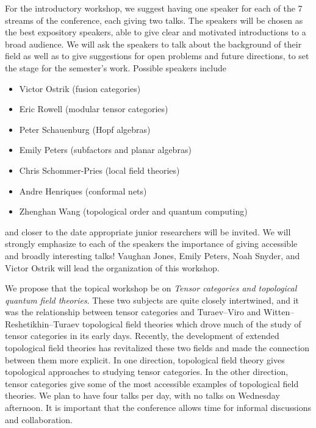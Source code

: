 \documentclass[12pt]{article}
\begin{document}
For the introductory workshop, we suggest having one speaker for each of the 7 streams of the conference, each giving two talks.  The speakers will be chosen as the best expository speakers, able to give clear and motivated introductions to a broad audience. We will ask the speakers to talk about the background of their field as well as to give suggestions for open problems and future directions, to set the stage for the semester's work. Possible speakers include
\begin{itemize}
  \setlength{\itemsep}{1pt}
  \setlength{\parskip}{0pt}
  \setlength{\parsep}{0pt}
\item Victor Ostrik (fusion categories) 
\item Eric Rowell (modular tensor categories)
\item Peter Schauenburg (Hopf algebras)
\item Emily Peters (subfactors and planar algebras) %
\item Chris Schommer-Pries (local field theories) %
\item Andre Henriques (conformal nets) %
\item Zhenghan Wang (topological order and quantum computing) %
\end{itemize}
and closer to the date appropriate junior researchers will be invited. 
We will strongly emphasize to each of the speakers the importance of giving accessible and broadly interesting talks!
Vaughan Jones, Emily Peters, Noah Snyder, and Victor Ostrik will lead the organization of this workshop.

We propose that the topical workshop be on \emph{Tensor categories and topological quantum field theories}. These two subjects are quite closely intertwined, and it was the relationship between tensor categories and Turaev--Viro and Witten--Reshetikhin--Turaev topological field theories which drove much of the study of tensor categories in its early days.  Recently, the development of extended topological field theories has revitalized these two fields and made the connection between them more explicit. In one direction, topological field theory gives topological approaches to studying tensor categories. In the other direction, tensor categories give some of the most accessible examples of topological field theories.  We plan to have four talks per day, with no talks on Wednesday afternoon. It is important that the conference allows time for informal discussions and collaboration.
\end{document}
